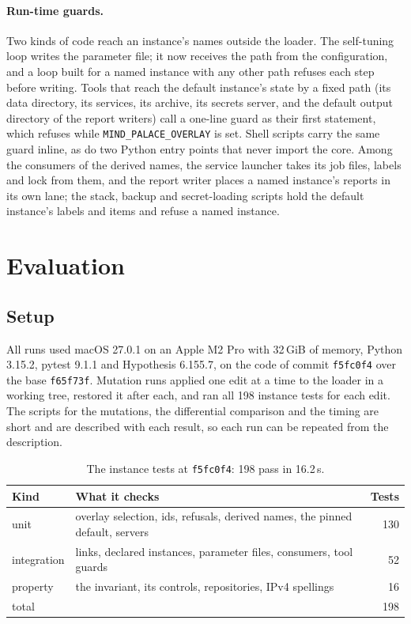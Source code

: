 \documentclass[11pt]{article}
\theoremstyle{plain}
\theoremstyle{definition}
\theoremstyle{remark}
\newcommand{\env}{\texttt{MIND\_PALACE\_OVERLAY}}
\begin{document}
\paragraph{Run-time guards.} Two kinds of code reach an instance's names outside the loader. The
self-tuning loop writes the parameter file; it now receives the path from the configuration, and a
loop built for a named instance with any other path refuses each step before writing. Tools that
reach the default instance's state by a fixed path (its data directory, its services, its archive,
its secrets server, and the default output directory of the report writers) call a one-line guard
as their first statement, which refuses while \env{} is set. Shell scripts carry the same guard
inline, as do two Python entry points that never import the core. Among the consumers of the
derived names, the service launcher takes its job files, labels and lock from them, and the report
writer places a named instance's reports in its own lane; the stack, backup and secret-loading
scripts hold the default instance's labels and items and refuse a named instance.

\section{Evaluation}\label{sec:eval}

\subsection{Setup}
All runs used macOS 27.0.1 on an Apple M2 Pro with 32\,GiB of memory, Python 3.15.2, pytest 9.1.1
and Hypothesis 6.155.7, on the code of commit \texttt{f5fc0f4} over the base \texttt{f65f73f}.
Mutation runs applied one edit at a time to the loader in a working tree, restored it after each,
and ran all 198 instance tests for each edit. The scripts for the mutations, the differential
comparison and the timing are short and are described with each result, so each run can be
repeated from the description.

\begin{table}[ht]
\centering\small
\caption{The instance tests at \texttt{f5fc0f4}: 198 pass in 16.2\,s.}\label{tab:tests}
\begin{tabular}{@{}llr@{}}
\toprule
Kind & What it checks & Tests \\
\midrule
unit & overlay selection, ids, refusals, derived names, the pinned default, servers & 130 \\
integration & links, declared instances, parameter files, consumers, tool guards & 52 \\
property & the invariant, its controls, repositories, IPv4 spellings & 16 \\
\midrule
total & & 198 \\
\bottomrule
\end{tabular}
\end{table}
\end{document}
